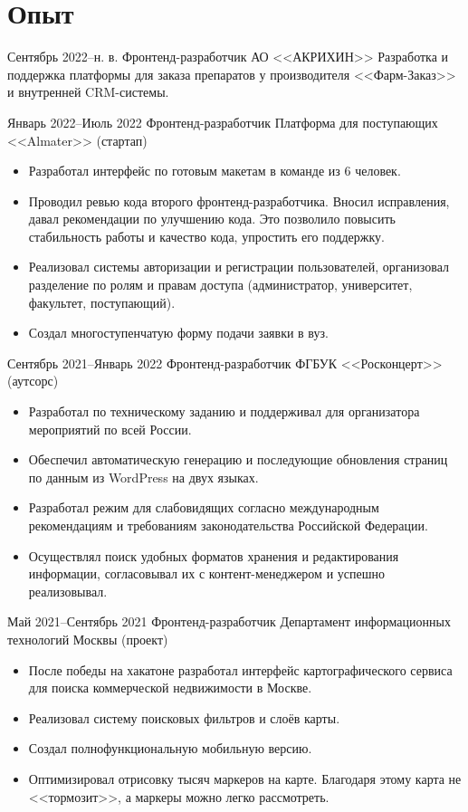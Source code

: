 \section*{Опыт}

\experience
{Сентябрь 2022\;--\;н. в.}
{Фронтенд-разработчик}
{АО <<АКРИХИН>>}
{Разработка и поддержка платформы для заказа препаратов у производителя <<Фарм-Заказ>> и внутренней CRM-системы.}

\experience
{Январь 2022\;--\;Июль 2022}
{Фронтенд-разработчик}
{Платформа для поступающих <<Almater>> (стартап)}
{
    \begin{itemize}[topsep=0pt]
        \item Разработал интерфейс по готовым макетам в команде из 6 человек.
        \item Проводил ревью кода второго фронтенд-разработчика. Вносил исправления, давал рекомендации по улучшению кода. Это позволило повысить стабильность работы и качество кода, упростить его поддержку.
        \item Реализовал системы авторизации и регистрации пользователей, организовал разделение по ролям и правам доступа (администратор, университет, факультет, поступающий).
        \item Создал многоступенчатую форму подачи заявки в вуз.
    \end{itemize}
}

\experience
{Сентябрь 2021\;--\;Январь 2022}
{Фронтенд-разработчик}
{ФГБУК <<Росконцерт>> (аутсорс)}
{
    \begin{itemize}[topsep=0pt]
        \item Разработал по техническому заданию и поддерживал  для организатора мероприятий по всей России.
        \item Обеспечил автоматическую генерацию и последующие обновления страниц по данным из WordPress на двух языках.
        \item Разработал режим для слабовидящих согласно международным рекомендациям и требованиям законодательства Российской Федерации.
        \item Осуществлял поиск удобных форматов хранения и редактирования информации, согласовывал их с контент-менеджером и успешно реализовывал.
    \end{itemize}
}

\experience
{Май 2021\;--\;Сентябрь 2021}
{Фронтенд-разработчик}
{Департамент информационных технологий Москвы (проект)}
{
    \begin{itemize}[topsep=0pt]
        \item После победы на хакатоне разработал интерфейс картографического сервиса для поиска коммерческой недвижимости в Москве.
        \item Реализовал систему поисковых фильтров и слоёв карты.
        \item Создал полнофункциональную мобильную версию.
        \item Оптимизировал отрисовку тысяч маркеров на карте. Благодаря этому карта не <<тормозит>>, а маркеры можно легко рассмотреть.
    \end{itemize}
}